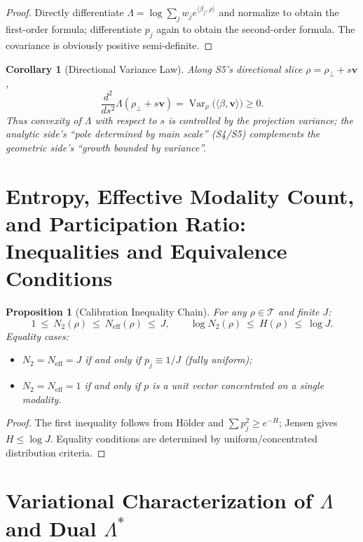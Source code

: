 \documentclass[11pt,a4paper]{article}
\newtheorem{proposition}[theorem]{Proposition}
\newtheorem{corollary}[theorem]{Corollary}
\theoremstyle{remark}
\DeclareMathOperator{\Var}{Var}
\begin{document}
\begin{proof}
Directly differentiate $\Lambda=\log\sum_j w_j e^{\langle \beta_j,\rho\rangle}$ and normalize to obtain the first-order formula; differentiate $p_j$ again to obtain the second-order formula. The covariance is obviously positive semi-definite.
\end{proof}

\begin{corollary}[Directional Variance Law]\label{cor:dir_var}
Along S5's directional slice $\rho=\rho_\perp+s\mathbf{v}$,
\begin{equation}
\frac{d^2}{ds^2}\Lambda(\rho_\perp+s\mathbf{v})=\Var_\rho\big(\langle \beta,\mathbf{v}\rangle\big)\ge 0.
\end{equation}
Thus convexity of $\Lambda$ with respect to $s$ is controlled by the projection variance; the analytic side's ``pole determined by main scale'' (S4/S5) complements the geometric side's ``growth bounded by variance''.
\end{corollary}

\section{Entropy, Effective Modality Count, and Participation Ratio: Inequalities and Equivalence Conditions}

\begin{proposition}[Calibration Inequality Chain]\label{prop:ineq}
For any $\rho\in\mathcal{T}$ and finite $J$:
\begin{equation}
1\ \le\ N_2(\rho)\ \le\ N_{\mathrm{eff}}(\rho)\ \le\ J,\qquad
\log N_2(\rho)\ \le\ H(\rho)\ \le\ \log J.
\end{equation}
Equality cases:
\begin{itemize}
\item $N_2=N_{\mathrm{eff}}=J$ if and only if $p_j\equiv 1/J$ (fully uniform);
\item $N_2=N_{\mathrm{eff}}=1$ if and only if $p$ is a unit vector concentrated on a single modality.
\end{itemize}
\end{proposition}

\begin{proof}
The first inequality follows from H\"older and $\sum p_j^2\ge e^{-H}$; Jensen gives $H\le\log J$. Equality conditions are determined by uniform/concentrated distribution criteria.
\end{proof}

\section{Variational Characterization of $\Lambda$ and Dual $\Lambda^\ast$}
\end{document}
